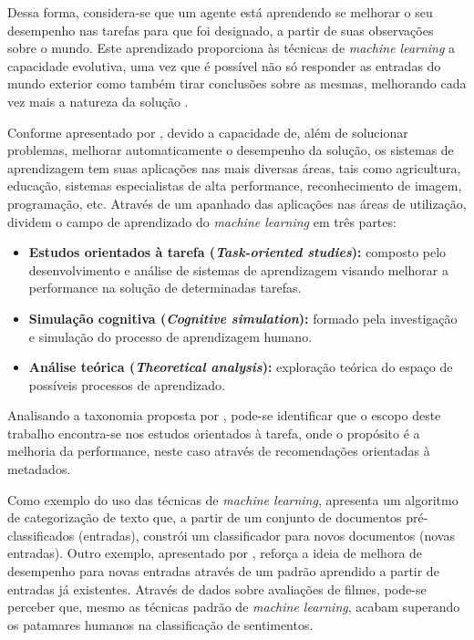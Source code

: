 \documentclass[12pt, openright, oneside, a4paper, brazil]{abntex2}
\begin{document}
Dessa forma, considera-se que um agente está aprendendo se melhorar o seu desempenho nas tarefas para que foi designado, a partir de suas observações sobre o mundo. Este aprendizado proporciona às técnicas de \textit{machine learning} a capacidade evolutiva, uma vez que é possível não só responder as entradas do mundo exterior como também tirar conclusões sobre as mesmas, melhorando cada vez mais a natureza da solução \cite{russell2004inteligencia}.

Conforme apresentado por , devido a capacidade de, além de solucionar problemas, melhorar automaticamente o desempenho da solução, os sistemas de aprendizagem tem suas aplicações nas mais diversas áreas, tais como agricultura, educação, sistemas especialistas de alta performance, reconhecimento de imagem, programação, etc. Através de um apanhado das aplicações nas áreas de utilização,  dividem o campo de aprendizado do \textit{machine learning} em três partes:

\begin{itemize}

	\item \textbf{Estudos orientados à tarefa (\textit{Task-oriented studies}):} composto pelo desenvolvimento e análise de sistemas de aprendizagem visando melhorar a performance na solução de determinadas tarefas.

	\item \textbf{Simulação cognitiva (\textit{Cognitive simulation}):} formado pela investigação e simulação do processo de aprendizagem humano.

	\item \textbf{Análise teórica (\textit{Theoretical analysis}):} exploração teórica do espaço de possíveis processos de aprendizado.

\end{itemize}

Analisando a taxonomia proposta por , pode-se identificar que o escopo deste trabalho encontra-se nos estudos orientados à tarefa, onde o propósito é a melhoria da performance, neste caso através de recomendações orientadas à metadados.

Como exemplo do uso das técnicas de \textit{machine learning},   apresenta um algoritmo de categorização de texto que, a partir de um conjunto de documentos pré-classificados (entradas), constrói um classificador para novos documentos (novas entradas). Outro exemplo, apresentado por , reforça a ideia de melhora de desempenho para novas entradas através de um padrão aprendido a partir de entradas já existentes. Através de dados sobre avaliações de filmes, pode-se perceber que, mesmo as técnicas padrão de \textit{machine learning}, acabam superando os patamares humanos na classificação de sentimentos.
\end{document}
